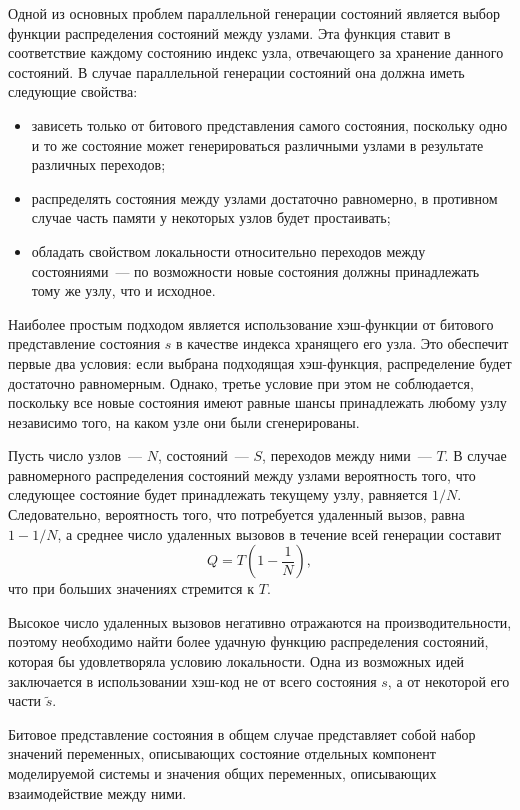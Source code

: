 \documentclass[12pt,a4paper,article]{bpm2}
\begin{document}
Одной из основных проблем параллельной генерации состояний является выбор функции распределения состояний между
узлами.
Эта функция ставит в соответствие каждому состоянию индекс узла, отвечающего за хранение данного
состояний.
В случае параллельной генерации состояний она должна иметь следующие свойства:

\begin{itemize}
\item зависеть только от битового представления самого состояния, поскольку одно и то же состояние
  может генерироваться различными узлами в результате различных переходов;

\item распределять состояния между узлами достаточно равномерно, в противном случае часть памяти у некоторых
  узлов будет простаивать;

\item обладать свойством локальности относительно переходов между состояниями~--- по возможности новые
  состояния должны принадлежать тому же узлу, что и исходное.
\end{itemize}

Наиболее простым подходом является использование хэш-функции от битового представление состояния $s$ в качестве индекса
хранящего его узла.
Это обеспечит первые два условия: если выбрана подходящая хэш-функция, распределение будет
достаточно равномерным.
Однако, третье условие при этом не соблюдается, поскольку все новые состояния имеют равные шансы
принадлежать любому узлу независимо того, на каком узле они были сгенерированы.

Пусть число узлов~--- $N$, состояний~--- $S$, переходов между ними~--- $T$.
В случае равномерного распределения состояний между узлами вероятность того, что следующее состояние будет принадлежать текущему узлу, равняется $1/N$.
Следовательно, вероятность того, что потребуется удаленный вызов, равна $1 - 1/N$, а среднее число удаленных
вызовов в течение всей генерации составит
\[\label{eq:rpc-partfull}
  Q = T (1 - \frac{1}{N}),
\]
что при больших значениях стремится к $T$.

Высокое число удаленных вызовов негативно отражаются на производительности, поэтому необходимо найти более удачную
функцию распределения состояний, которая бы удовлетворяла условию локальности.
Одна из возможных идей заключается в использовании хэш-код не от всего состояния $s$, а от некоторой его части $\tilde{s}$.

Битовое представление состояния в общем случае представляет собой набор значений переменных, описывающих состояние отдельных компонент моделируемой системы и значения общих переменных, описывающих взаимодействие между ними.
\end{document}

